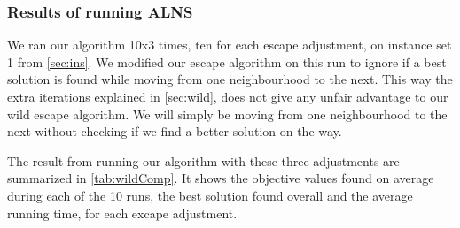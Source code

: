 \documentclass[../main.tex]{subfiles}
\begin{document}
\subsubsection{Results of running ALNS}
We ran our algorithm 10x3 times, ten for each escape adjustment, on instance set 1 from \cref{sec:ins}.
We modified our escape algorithm on this run to ignore if a best solution is found while moving from one neighbourhood to the next. 
This way the extra iterations explained in \cref{sec:wild}, does not give any unfair advantage to our wild escape algorithm. We will simply be moving from one neighbourhood to the next without checking if we find a better solution on the way.
\par
The result from running our algorithm with these three adjustments are summarized in \cref{tab:wildComp}.
It shows the objective values found on average during each of the 10 runs, the best solution found overall and the average running time, for each excape adjustment.
\end{document}
